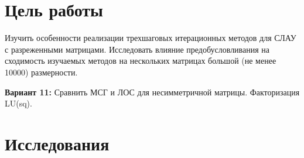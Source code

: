 
\section{Цель работы}

Изучить особенности реализации трехшаговых итерационных методов для СЛАУ с разреженными матрицами. Исследовать влияние предобусловливания на сходимость изучаемых методов на нескольких матрицах большой (не менее 10000) размерности.

\textbf{Вариант 11:} Сравнить МСГ и ЛОС для несимметричной матрицы. Факторизация LU(sq).

\section{Исследования}

